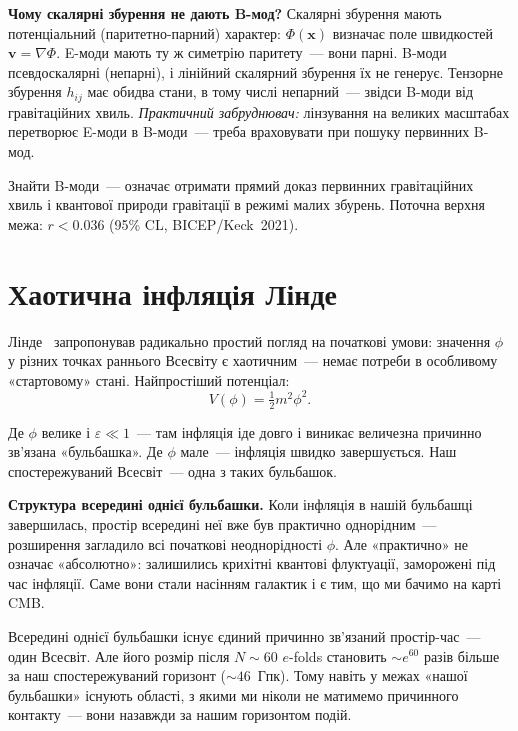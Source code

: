 \documentclass[12pt, a4paper]{article}
\begin{document}
\begin{keybox}
\textbf{Чому скалярні збурення не дають B-мод?}
Скалярні збурення мають потенціальний (паритетно-парний) характер:
$\Phi(\mathbf{x})$ визначає поле швидкостей $\mathbf{v} = \nabla\Phi$.
E-моди мають ту ж симетрію паритету~--- вони парні.
B-моди псевдоскалярні (непарні), і лінійний скалярний збурення їх не генерує.
Тензорне збурення $h_{ij}$ має обидва стани, в тому числі непарний~---
звідси B-моди від гравітаційних хвиль.
\textit{Практичний забруднювач:} лінзування на великих масштабах перетворює
E-моди в B-моди~--- треба враховувати при пошуку первинних B-мод.
\end{keybox}

Знайти B-моди~--- означає отримати прямий доказ первинних гравітаційних хвиль
і квантової природи гравітації в режимі малих збурень.
Поточна верхня межа: $r < 0.036$ (95\% CL, BICEP/Keck~2021).

\section{Хаотична інфляція Лінде}
\label{sec:chaotic}

Лінде~\cite{linde_1983} запропонував радикально простий погляд
на початкові умови: значення $\phi$ у різних точках раннього
Всесвіту є хаотичним~--- немає потреби в особливому «стартовому»
стані. Найпростіший потенціал:
\begin{equation*}
  V(\phi) = \tfrac{1}{2}m^2\phi^2.
\end{equation*}

Де $\phi$ велике і $\varepsilon \ll 1$~--- там інфляція іде довго
і виникає величезна причинно зв'язана «бульбашка». Де $\phi$ мале~---
інфляція швидко завершується. Наш спостережуваний Всесвіт~---
одна з таких бульбашок.

\textbf{Структура всередині однієї бульбашки.} Коли інфляція
в нашій бульбашці завершилась, простір всередині неї вже був
практично однорідним~--- розширення загладило всі початкові
неоднорідності $\phi$. Але «практично» не означає «абсолютно»:
залишились крихітні квантові флуктуації, заморожені під час
інфляції. Саме вони стали насінням галактик і є тим, що ми
бачимо на карті CMB.

Всередині однієї бульбашки існує єдиний причинно зв'язаний
простір-час~--- один Всесвіт. Але його розмір після $N \sim 60$
$e$-folds становить $\sim e^{60}$ разів більше за наш
спостережуваний горизонт ($\sim 46$~Гпк). Тому навіть у
межах «нашої бульбашки» існують області, з якими ми ніколи
не матимемо причинного контакту~--- вони назавжди за
нашим горизонтом подій.
\end{document}
